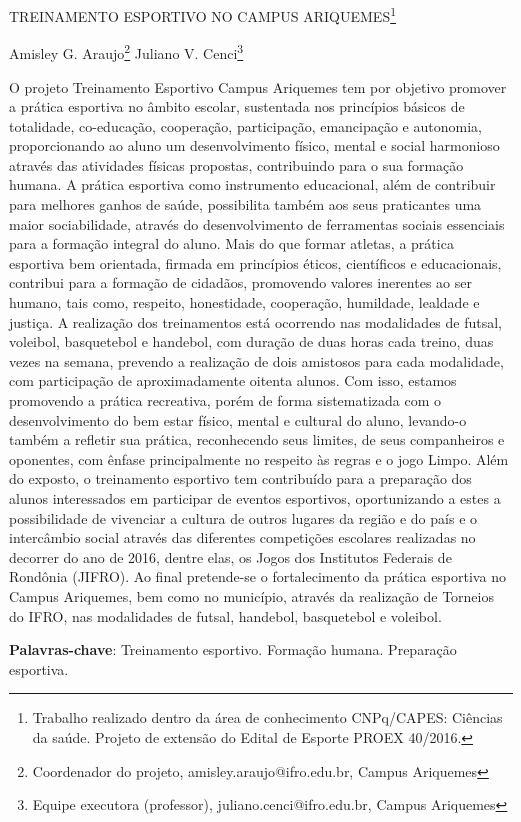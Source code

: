 \documentclass[article,12pt,onesidea,4paper,english,brazil]{abntex2}
\begin{document}
	
	
	\frenchspacing 
	
	\begin{center}
		\LARGE TREINAMENTO ESPORTIVO NO CAMPUS ARIQUEMES\footnote{Trabalho realizado dentro da área de conhecimento CNPq/CAPES: Ciências da saúde. Projeto de extensão do Edital de Esporte PROEX 40/2016.}
		
		\normalsize
		Amisley G. Araujo\footnote{Coordenador do projeto, amisley.araujo@ifro.edu.br, Campus Ariquemes} 
		Juliano V. Cenci\footnote{Equipe executora (professor), juliano.cenci@ifro.edu.br, Campus Ariquemes} 
		 
	\end{center}
	
	\noindent O projeto Treinamento Esportivo Campus Ariquemes tem por objetivo promover a prática esportiva no âmbito escolar, sustentada nos princípios básicos de totalidade, co-educação, cooperação, participação, emancipação e autonomia, proporcionando ao aluno um desenvolvimento físico, mental e social harmonioso através das atividades físicas propostas, contribuindo para o sua formação humana. A prática esportiva como instrumento educacional, além de contribuir para melhores ganhos de saúde, possibilita também aos seus praticantes uma maior sociabilidade, através do desenvolvimento de ferramentas sociais essenciais para a formação integral do aluno. Mais do que formar atletas, a prática esportiva bem orientada, firmada em princípios éticos, científicos e educacionais, contribui para a formação de cidadãos, promovendo valores inerentes ao ser humano, tais como, respeito, honestidade, cooperação, humildade, lealdade e justiça. A realização dos treinamentos está ocorrendo nas modalidades de futsal, voleibol, basquetebol e handebol, com duração de duas horas cada treino, duas vezes na semana, prevendo a realização de dois amistosos para cada modalidade, com participação de aproximadamente oitenta alunos. Com isso, estamos promovendo a prática recreativa, porém de forma sistematizada com o desenvolvimento do bem estar físico, mental e cultural do aluno, levando-o também a refletir sua prática, reconhecendo seus limites, de seus companheiros e oponentes, com ênfase principalmente no respeito às regras e o jogo Limpo. Além do exposto, o treinamento esportivo tem contribuído para a preparação dos alunos interessados em participar de eventos esportivos, oportunizando a estes a possibilidade de vivenciar a cultura de outros lugares da região e do país e o intercâmbio social através das diferentes competições escolares realizadas no decorrer do ano de 2016, dentre elas, os Jogos dos Institutos Federais de Rondônia (JIFRO). Ao final pretende-se o fortalecimento da prática esportiva no Campus Ariquemes, bem como no município, através da realização de Torneios do IFRO, nas modalidades de futsal, handebol, basquetebol e voleibol.
	
	\vspace{\onelineskip}
	
	\noindent
	\textbf{Palavras-chave}: Treinamento esportivo. Formação humana. Preparação esportiva.
	
\end{document}
